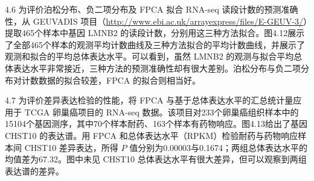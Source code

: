 \begin{bookexample}{4.6}
为评价泊松分布、负二项分布及 FPCA 拟合 RNA-seq 读段计数的预测准确性，从 GEUVADIS 项目（\url{http://www.ebi.ac.uk/arrayexpress/files/E-GEUV-3/}）提取465个样本中基因 LMNB2 的读段计数，分别用这三种方法拟合。图4.12展示了全部465个样本的观测平均计数曲线及三种方法拟合的平均计数曲线，并展示了观测和拟合的平均总体表达水平。可以看到，虽然 LMNB2 的观测与拟合平均总体表达水平非常接近，三种方法的预测准确性却有很大差别。泊松分布与负二项分布对计数数据的拟合较差，FPCA 的拟合则相当好。
\end{bookexample}


\begin{bookexample}{4.7}
为评价差异表达检验的性能，将 FPCA 与基于总体表达水平的汇总统计量应用于 TCGA 卵巢癌项目的 RNA-seq 数据。该项目对233个卵巢癌组织样本中的15104个基因测序，其中70个样本耐药、163个样本有药物响应。图4.13给出了基因 CHST10 的表达谱。用 FPCA 和总体表达水平（RPKM）检验耐药与药物响应样本间 CHST10 差异表达，所得 $P$ 值分别为0.00003与0.1674；两组总体表达水平的均值差为67.32。图中未见 CHST10 总体表达水平有很大差异，但可以观察到两组表达谱的差异。
\end{bookexample}

\FloatBarrier
